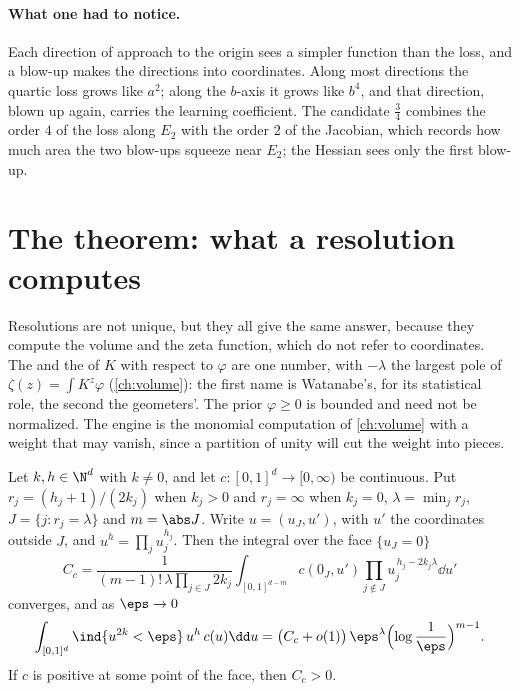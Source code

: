 \begin{refsection}
\paragraph{What one had to notice.} Each direction of approach to the origin sees a simpler function than the loss, and a blow-up makes the directions into coordinates. Along most directions the quartic loss grows like $a^2$; along the $b$-axis it grows like $b^4$, and that direction, blown up again, carries the learning coefficient. The candidate $\frac34$ combines the order $4$ of the loss along $E_2$ with the order $2$ of the Jacobian, which records how much area the two blow-ups squeeze near $E_2$; the Hessian sees only the first blow-up.

\section{The theorem: what a resolution computes}\label{sec:blowups:resolution}

Resolutions are not unique, but they all give the same answer, because they compute the volume and the zeta function, which do not refer to coordinates. The  and the  of $K$ with respect to $\varphi$ are one number, with $-\lambda$ the largest pole of $\zeta(z)=\int K^z\varphi$ (\cref{ch:volume}): the first name is Watanabe's, for its statistical role, the second the geometers'. The prior $\varphi\ge0$ is bounded and need not be normalized. The engine is the monomial computation of \cref{ch:volume} with a weight that may vanish, since a partition of unity will cut the weight into pieces.

\begin{lemma}\label{lem:blowups:monomial}
Let $k,h\in\N^d$ with $k\ne0$, and let $c\colon[0,1]^d\to[0,\infty)$ be continuous. Put $r_j=(h_j+1)/(2k_j)$ when $k_j>0$ and $r_j=\infty$ when $k_j=0$, $\lambda=\min_jr_j$, $J=\{j:r_j=\lambda\}$ and $m=\abs J$. Write $u=(u_J,u')$, with $u'$ the coordinates outside $J$, and $u^h=\prod_ju_j^{h_j}$. Then the integral over the face $\{u_J=0\}$
\begin{equation}\label{eq:blowups:constant}
C_c=\frac{1}{(m-1)!\,\lambda\prod_{j\in J}2k_j}\int_{[0,1]^{d-m}}c(0_J,u')\prod_{j\notin J}u_j^{\,h_j-2k_j\lambda}\dd u'
\end{equation}
converges, and as $\eps\to0$
\[
\int_{[0,1]^d}\ind\{u^{2k}<\eps\}\,u^h\,c(u)\dd u=\bigl(C_c+o(1)\bigr)\,\eps^\lambda\Bigl(\log\frac1\eps\Bigr)^{m-1}.
\]
If $c$ is positive at some point of the face, then $C_c>0$.
\end{lemma}


\end{refsection}
